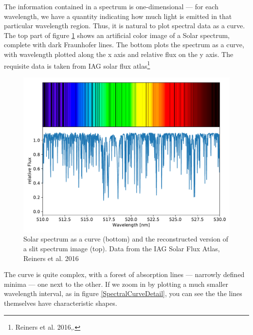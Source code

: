 \documentclass[twocolumn,apj]{openjournal}
\begin{document}
The information contained in a spectrum is one-dimensional --- for each wavelength, we have a quantity indicating how much light is emitted in that particular wavelength region. Thus, it is natural to plot spectral data as a curve. The top part of figure \ref{SpectralCurve} shows an artificial color image of a Solar spectrum, complete with dark Fraunhofer lines. The bottom plots the spectrum as a curve, with wavelength plotted along the x axis and relative flux on the y axis. The requisite data is taken from IAG solar flux atlas\footnote{
Reiners et al. 2016,.}
\begin{figure}[htbp]
\begin{center}
\includegraphics[width=\linewidth]{solar-spectrum.pdf}
\caption{Solar spectrum as a curve (bottom) and the reconstructed version of a slit spectrum image (top). Data from the IAG Solar Flux Atlas, Reiners et al. 2016 }
\label{SpectralCurve}
\end{center}
\end{figure}
The curve is quite complex, with a forest of absorption lines --- narrowly defined minima --- one next to the other. If we zoom in by plotting a much smaller wavelength interval, as in figure \ref{SpectralCurveDetail}, you can see the the lines themselves have characteristic shapes. 
\end{document}
